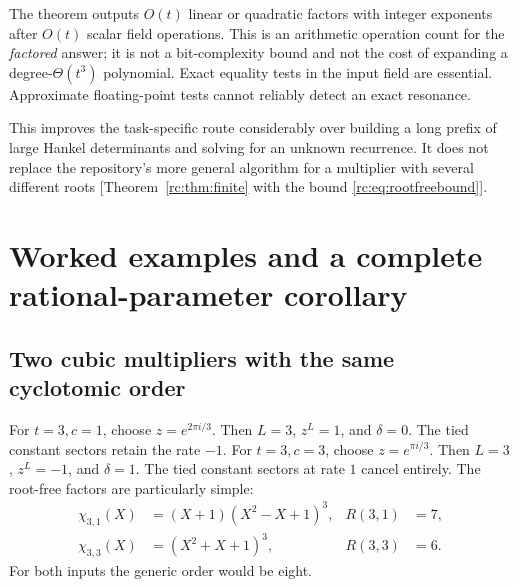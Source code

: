 \documentclass[11pt,a4paper]{article}
\numberwithin{equation}{section}
\theoremstyle{definition}
\theoremstyle{remark}
\begin{document}
The theorem outputs $O(t)$ linear or quadratic factors with integer
exponents after $O(t)$ scalar field operations.  This is an arithmetic
operation count for the \emph{factored} answer; it is not a bit-complexity
bound and not the cost of expanding a degree-$\Theta(t^3)$ polynomial.
Exact equality tests in the input field are essential.  Approximate
floating-point tests cannot reliably detect an exact resonance.

This improves the task-specific route considerably over building a
long prefix of large Hankel determinants and solving for an unknown
recurrence.  It does not replace the repository's more general
algorithm for a multiplier with several different roots
[Theorem~\ref{rc:thm:finite} with the bound \eqref{rc:eq:rootfreebound}].

\section{Worked examples and a complete rational-parameter corollary}
\label{cyc:sec:examples}

\subsection{Two cubic multipliers with the same cyclotomic order}
For $t=3,c=1$, choose $z=e^{2\pi i/3}$.  Then $L=3$, $z^L=1$,
and $\delta=0$.  The tied constant sectors retain the rate $-1$.
For $t=3,c=3$, choose $z=e^{\pi i/3}$.  Then $L=3$, $z^L=-1$,
and $\delta=1$.  The tied constant sectors at rate $1$ cancel entirely.
The root-free factors are particularly simple:
\begin{align}
 \chi_{3,1}(X)&=(X+1)(X^2-X+1)^3,
                  &R(3,1)&=7,\label{cyc:eq:c1c3a}\\
 \chi_{3,3}(X)&=(X^2+X+1)^3,
                  &R(3,3)&=6.\label{cyc:eq:c1c3b}
\end{align}
For both inputs the generic order would be eight.
\end{document}
